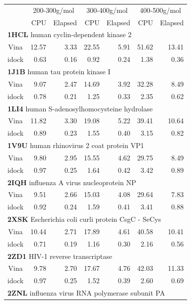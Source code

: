 \begin{table}
\centering
\begin{tabular*}
{\linewidth}
{@{\extracolsep{\fill}}crrrrrr}
\toprule
& \multicolumn{2}{c}{200-300g/mol} & \multicolumn{2}{c}{300-400g/mol} & \multicolumn{2}{c}{400-500g/mol}\\
& CPU & Elapsed & CPU & Elapsed & CPU & Elapsed\\
\midrule
\multicolumn{7}{l}{\textbf{1HCL} human cyclin-dependent kinase 2}\\
Vina  & 12.57 &  3.33 & 22.55 &  5.91 & 51.62 & 13.41\\
idock &  0.63 &  0.16 &  0.92 &  0.24 &  1.38 &  0.36\\
\multicolumn{7}{l}{\textbf{1J1B} human tau protein kinase I}\\
Vina  &  9.07 &  2.47 & 14.69 &  3.92 & 32.28 &  8.49\\
idock &  0.78 &  0.21 &  1.25 &  0.33 &  2.35 &  0.62\\
\multicolumn{7}{l}{\textbf{1LI4} human S-adenosylhomocysteine hydrolase}\\
Vina  & 11.82 &  3.30 & 19.08 &  5.22 & 39.41 & 10.64\\
idock &  0.89 &  0.23 &  1.55 &  0.40 &  3.15 &  0.82\\
\multicolumn{7}{l}{\textbf{1V9U} human rhinovirus 2 coat protein VP1}\\
Vina  &  9.80 &  2.95 & 15.55 &  4.62 & 29.75 &  8.49\\
idock &  0.97 &  0.25 &  1.64 &  0.42 &  3.42 &  0.89\\
\multicolumn{7}{l}{\textbf{2IQH} influenza A virus nucleoprotein NP}\\
Vina  &  9.51 &  2.66 & 15.03 &  4.08 & 29.64 &  7.83\\
idock &  0.92 &  0.24 &  1.59 &  0.41 &  3.41 &  0.88\\
\multicolumn{7}{l}{\textbf{2XSK} Escherichia coli curli protein CsgC - SeCys}\\
Vina  & 10.44 &  2.71 & 17.89 &  4.61 & 40.58 & 10.41\\
idock &  0.71 &  0.19 &  1.16 &  0.30 &  2.16 &  0.56\\
\multicolumn{7}{l}{\textbf{2ZD1} HIV-1 reverse transcriptase}\\
Vina  &  9.78 &  2.70 & 17.67 &  4.76 & 42.03 & 11.33\\
idock &  0.97 &  0.25 &  1.52 &  0.39 &  2.60 &  0.69\\
\multicolumn{7}{l}{\textbf{2ZNL} influenza virus RNA polymerase subunit PA}\\

\end{tabular*}
\end{table}
